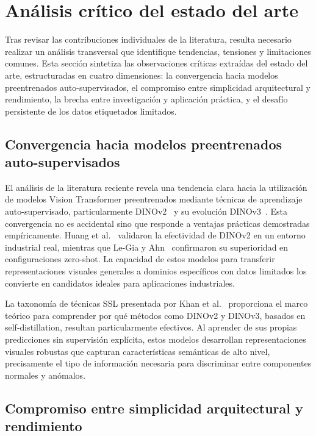 \section{Análisis crítico del estado del arte}

Tras revisar las contribuciones individuales de la literatura, resulta necesario realizar un análisis transversal que identifique tendencias, tensiones y limitaciones comunes. Esta sección sintetiza las observaciones críticas extraídas del estado del arte, estructuradas en cuatro dimensiones: la convergencia hacia modelos preentrenados auto-supervisados, el compromiso entre simplicidad arquitectural y rendimiento, la brecha entre investigación y aplicación práctica, y el desafío persistente de los datos etiquetados limitados.

\subsection{Convergencia hacia modelos preentrenados auto-supervisados}

El análisis de la literatura reciente revela una tendencia clara hacia la utilización de modelos Vision Transformer preentrenados mediante técnicas de aprendizaje auto-supervisado, particularmente DINOv2~\cite{oquab2024dinov2} y su evolución DINOv3~\cite{simeoni2025dinov3}. Esta convergencia no es accidental sino que responde a ventajas prácticas demostradas empíricamente. Huang et al.~\cite{huang2025semiconductor} validaron la efectividad de DINOv2 en un entorno industrial real, mientras que Le-Gia y Ahn~\cite{legia2025consistent} confirmaron su superioridad en configuraciones zero-shot. La capacidad de estos modelos para transferir representaciones visuales generales a dominios específicos con datos limitados los convierte en candidatos ideales para aplicaciones industriales.

La taxonomía de técnicas SSL presentada por Khan et al.~\cite{khan2024survey} proporciona el marco teórico para comprender por qué métodos como DINOv2 y DINOv3, basados en self-distillation, resultan particularmente efectivos. Al aprender de sus propias predicciones sin supervisión explícita, estos modelos desarrollan representaciones visuales robustas que capturan características semánticas de alto nivel, precisamente el tipo de información necesaria para discriminar entre componentes normales y anómalos.

\subsection{Compromiso entre simplicidad arquitectural y rendimiento}

